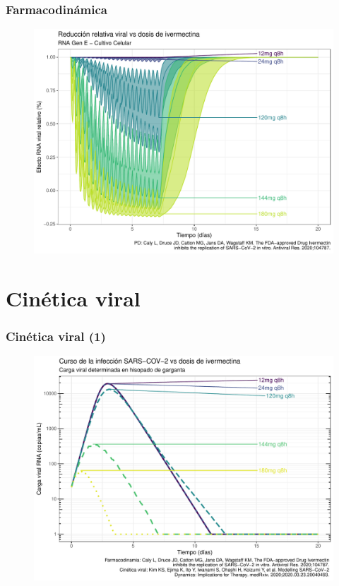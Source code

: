 \documentclass[12pt]{beamer}
\begin{document}
	\begin{frame}	
		\frametitle{Farmacodinámica}		
		\begin{figure}
			\centering
			\includegraphics[width=0.9\linewidth]{../modelo_PD_2/figuras/G2}
			\label{fig:g1}
		\end{figure}
	\end{frame}
	
	\section{Cinética viral}
	\begin{frame}	
		\frametitle{Cinética viral (1)}		
		\begin{figure}
			\centering
			\includegraphics[width=0.9\linewidth]{../modelo_PD_2/figuras/G3}
			\label{fig:g1}
		\end{figure}
	\end{frame}
\end{document}
